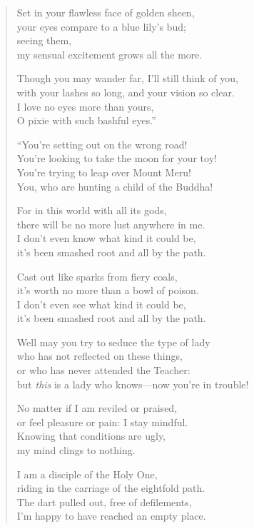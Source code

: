 \documentclass[12pt,openany]{book}%
\begin{document}
\begin{verse}
Set in your flawless face of golden sheen, \\
your eyes compare to a blue lily’s bud; \\
seeing them, \\
my sensual excitement grows all the more. 

Though you may wander far, I’ll still think of you, \\
with your lashes so long, and your vision so clear. \\
I love no eyes more than yours, \\
O pixie with such bashful eyes.” 

“You’re setting out on the wrong road! \\
You’re looking to take the moon for your toy! \\
You’re trying to leap over Mount Meru! \\
You, who are hunting a child of the Buddha! 

For in this world with all its gods, \\
there will be no more lust anywhere in me. \\
I don’t even know what kind it could be, \\
it’s been smashed root and all by the path. 

Cast out like sparks from fiery coals, \\
it’s worth no more than a bowl of poison. \\
I don’t even see what kind it could be, \\
it’s been smashed root and all by the path. 

Well may you try to seduce the type of lady \\
who has not reflected on these things, \\
or who has never attended the Teacher: \\
but \emph{this} is a lady who knows—now you’re in trouble! 

No matter if I am reviled or praised, \\
or feel pleasure or pain: I stay mindful. \\
Knowing that conditions are ugly, \\
my mind clings to nothing. 

I am a disciple of the Holy One, \\
riding in the carriage of the eightfold path. \\
The dart pulled out, free of defilements, \\
I’m happy to have reached an empty place. 


\end{verse}
\end{document}
